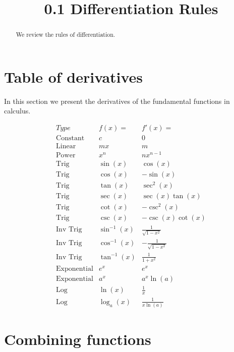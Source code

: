 \documentclass[handout]{ximera}
\title{0.1 Differentiation Rules}
\begin{document}
\begin{abstract}
We review the rules of differentiation.
\end{abstract}

\maketitle


\section{Table of derivatives}

In this section we present the derivatives of the fundamental functions in calculus.  

\begin{center}
\[
\begin{array}{c|c|c}
		Type & f(x)= & f'(x)=  \\
		\hline
		\text{Constant} & c & 0 \\
		\text{Linear} & mx & m  \\
		\text{Power} & x^n & nx^{n-1}  \\
		\hline
		\text{Trig} & \sin(x) & \cos(x) \\
		\text{Trig} & \cos(x) & -\sin(x) \\
		\hline
		\text{Trig} & \tan(x) & \sec^2(x) \\
		\text{Trig} & \sec(x) & \sec(x)\tan(x) \\
		\hline
		\text{Trig} & \cot(x) & -\csc^2(x)\ \\
		\text{Trig} & \csc(x) & -\csc(x)\cot(x) \\
		\hline
		\text{Inv Trig} & \sin^{-1}(x) & \frac{1}{\sqrt{1-x^2}} \\
		\text{Inv Trig} & \cos^{-1}(x) & -\frac{1}{\sqrt{1-x^2}} \\
		\text{Inv Trig} & \tan^{-1}(x) & \frac{1}{1+x^2} \\
		\hline
		\text{Exponential} & e^x & e^x \\
		\text{Exponential} & a^x & a^x\ln(a) \\
		\hline
		\text{Log} & \ln(x) & \frac{1}{x} \\
		\text{Log} & \log_a(x) & \frac{1}{x\ln(a)}
	\end{array}
    \]
\end{center}


\section{Combining functions}
\end{document}
